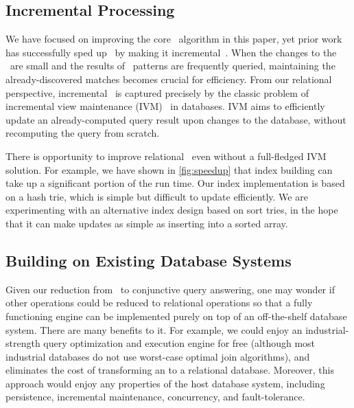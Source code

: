 \subsection{Incremental Processing}\label{sec:incremental}
We have focused on improving the core \ematching\ algorithm in this paper,
 yet prior work has successfully sped up \ematching\ by making it incremental~\cite{efficient-ematching}.
When the changes to the \egraph\ are small and the results of \ematching\
 patterns are frequently queried,
 maintaining the already-discovered matches becomes crucial for efficiency.
From our relational perspective, incremental \ematching\
 is captured precisely by the classic problem of
 incremental view maintenance (IVM)~\cite{DBLP:conf/vldb/CeriW91,
 DBLP:conf/sigmod/SalemBCL00,DBLP:conf/sigmod/ZhugeGHW95} in databases.
IVM aims to efficiently update an already-computed query result upon changes
 to the database, without recomputing the query from scratch.

There is opportunity to improve relational \ematching\ even without a
 full-fledged IVM solution.
For example, we have shown in \autoref{fig:speedup} that index building
 can take up a significant portion of the run time.
Our index implementation is based on a hash trie,
 which is simple but difficult to update efficiently.
We are experimenting with an alternative index design based on sort tries,
 in the hope that it can make updates as simple as inserting into a sorted array.

\subsection{Building on Existing Database Systems}
Given our reduction from \ematching\ to conjunctive query answering,
 one may wonder if other \egraph operations could be reduced to
 relational operations so that a fully functioning \egraph engine
 can be implemented purely on top of an off-the-shelf database system.
There are many benefits to it.
For example, we could enjoy an industrial-strength query optimization
 and execution engine for free
 (although most industrial databases do not use worst-case optimal join algorithms),
 and eliminates the cost of transforming an \egraph
 to a relational database.
Moreover, this approach would enjoy any properties of the host database
 system, including persistence, incremental maintenance, concurrency, and fault-tolerance.

